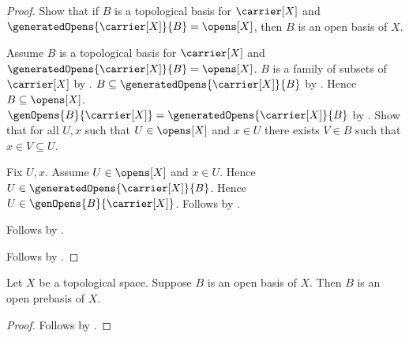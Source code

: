 \begin{proof}
    Show that if $B$ is a topological basis for $\carrier[X]$ and
        $\generatedOpens{\carrier[X]}{B}=\opens[X]$, then
        $B$ is an open basis of $X$.
    \begin{subproof}
        Assume $B$ is a topological basis for $\carrier[X]$ and
            $\generatedOpens{\carrier[X]}{B}=\opens[X]$.
        $B$ is a family of subsets of $\carrier[X]$ by
            .
        $B\subseteq\generatedOpens{\carrier[X]}{B}$ by
            .
        Hence $B\subseteq\opens[X]$.
        $\genOpens{B}{\carrier[X]}
            =\generatedOpens{\carrier[X]}{B}$ by
            .
        Show that for all $U,x$ such that $U\in\opens[X]$ and $x\in U$
            there exists $V\in B$ such that $x\in V\subseteq U$.
        \begin{subproof}
            Fix $U,x$.
            Assume $U\in\opens[X]$ and $x\in U$.
            Hence $U\in\generatedOpens{\carrier[X]}{B}$.
            Hence $U\in\genOpens{B}{\carrier[X]}$.
            Follows by .
        \end{subproof}
        Follows by .
    \end{subproof}
    Follows by \auto.
\end{proof}

\begin{corollary}\label{open_basis_is_open_prebasis}
    Let $X$ be a topological space.
    Suppose $B$ is an open basis of $X$.
    Then $B$ is an open prebasis of $X$.
\end{corollary}
\begin{proof}
    Follows by
        .
\end{proof}

